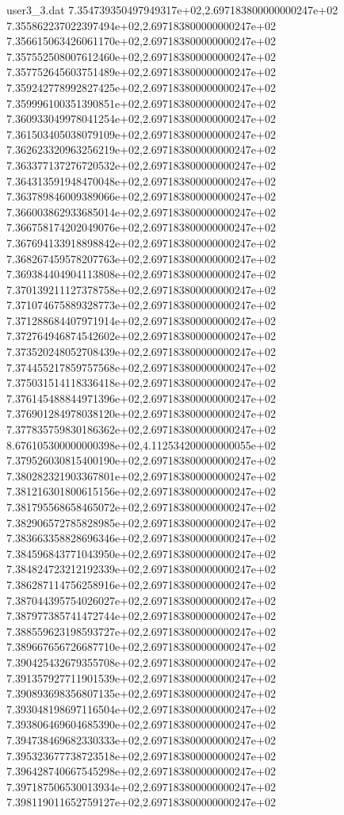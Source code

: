 \begin{filecontents}{user3_3.dat}
7.354739350497949317e+02,2.697183800000000247e+02
7.355862237022397494e+02,2.697183800000000247e+02
7.356615063426061170e+02,2.697183800000000247e+02
7.357552508007612460e+02,2.697183800000000247e+02
7.357752645603751489e+02,2.697183800000000247e+02
7.359242778992827425e+02,2.697183800000000247e+02
7.359996100351390851e+02,2.697183800000000247e+02
7.360933049978041254e+02,2.697183800000000247e+02
7.361503405038079109e+02,2.697183800000000247e+02
7.362623320963256219e+02,2.697183800000000247e+02
7.363377137276720532e+02,2.697183800000000247e+02
7.364313591948470048e+02,2.697183800000000247e+02
7.363789846009389066e+02,2.697183800000000247e+02
7.366003862933685014e+02,2.697183800000000247e+02
7.366758174202049076e+02,2.697183800000000247e+02
7.367694133918898842e+02,2.697183800000000247e+02
7.368267459578207763e+02,2.697183800000000247e+02
7.369384404904113808e+02,2.697183800000000247e+02
7.370139211127378758e+02,2.697183800000000247e+02
7.371074675889328773e+02,2.697183800000000247e+02
7.371288684407971914e+02,2.697183800000000247e+02
7.372764946874542602e+02,2.697183800000000247e+02
7.373520248052708439e+02,2.697183800000000247e+02
7.374455217859757568e+02,2.697183800000000247e+02
7.375031514118336418e+02,2.697183800000000247e+02
7.376145488844971396e+02,2.697183800000000247e+02
7.376901284978038120e+02,2.697183800000000247e+02
7.377835759830186362e+02,2.697183800000000247e+02
8.676105300000000398e+02,4.112534200000000055e+02
7.379526030815400190e+02,2.697183800000000247e+02
7.380282321903367801e+02,2.697183800000000247e+02
7.381216301800615156e+02,2.697183800000000247e+02
7.381795568658465072e+02,2.697183800000000247e+02
7.382906572785828985e+02,2.697183800000000247e+02
7.383663358828696346e+02,2.697183800000000247e+02
7.384596843771043950e+02,2.697183800000000247e+02
7.384824723212192339e+02,2.697183800000000247e+02
7.386287114756258916e+02,2.697183800000000247e+02
7.387044395754026027e+02,2.697183800000000247e+02
7.387977385741472744e+02,2.697183800000000247e+02
7.388559623198593727e+02,2.697183800000000247e+02
7.389667656726687710e+02,2.697183800000000247e+02
7.390425432679355708e+02,2.697183800000000247e+02
7.391357927711901539e+02,2.697183800000000247e+02
7.390893698356807135e+02,2.697183800000000247e+02
7.393048198697116504e+02,2.697183800000000247e+02
7.393806469604685390e+02,2.697183800000000247e+02
7.394738469682330333e+02,2.697183800000000247e+02
7.395323677738723518e+02,2.697183800000000247e+02
7.396428740667545298e+02,2.697183800000000247e+02
7.397187506530013934e+02,2.697183800000000247e+02
7.398119011652759127e+02,2.697183800000000247e+02

\end{filecontents}
